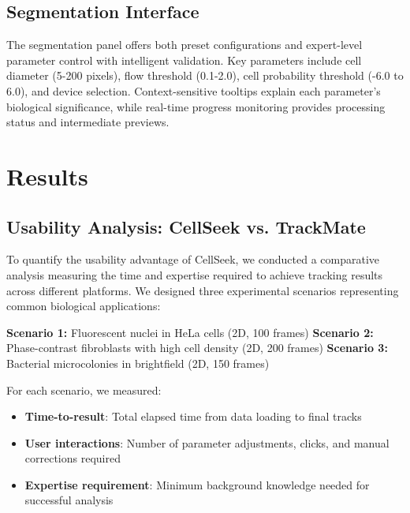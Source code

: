 \documentclass[12pt]{article}
\begin{document}
\subsection{Segmentation Interface}

The segmentation panel offers both preset configurations and expert-level parameter control with intelligent validation. Key parameters include cell diameter (5-200 pixels), flow threshold (0.1-2.0), cell probability threshold (-6.0 to 6.0), and device selection. Context-sensitive tooltips explain each parameter's biological significance, while real-time progress monitoring provides processing status and intermediate previews.

\section{Results}

\subsection{Usability Analysis: CellSeek vs. TrackMate}


To quantify the usability advantage of CellSeek, we conducted a comparative analysis measuring the time and expertise required to achieve tracking results across different platforms. We designed three experimental scenarios representing common biological applications:

\textbf{Scenario 1:} Fluorescent nuclei in HeLa cells (2D, 100 frames)
\textbf{Scenario 2:} Phase-contrast fibroblasts with high cell density (2D, 200 frames)
\textbf{Scenario 3:} Bacterial microcolonies in brightfield (2D, 150 frames)

For each scenario, we measured:
\begin{itemize}
  \item \textbf{Time-to-result}: Total elapsed time from data loading to final tracks
  \item \textbf{User interactions}: Number of parameter adjustments, clicks, and manual corrections required
  \item \textbf{Expertise requirement}: Minimum background knowledge needed for successful analysis
\end{itemize}
\end{document}

